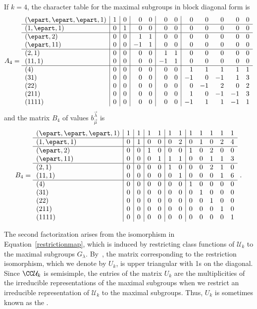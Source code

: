 \begin{example}
If $k = 4$, the character table for the maximal
subgroups in block diagonal form is
$$
A_4 = \begin{array}{l|r|r|rr|rr|rrrrr}
(\epart, \epart, \epart, 1) & 1 & 0 & 0 & 0 & 0 & 0 & 0 & 0 & 0 & 0 & 0\\
\hline
(1, \epart, 1) &0 & 1 & 0 & 0 & 0 & 0 & 0 & 0 & 0 & 0 & 0\\
\hline
(\epart, 2) &0 & 0 & 1 & 1 & 0 & 0 & 0 & 0 & 0 & 0 & 0\\
(\epart, 11) &0 & 0 & -1 & 1 & 0 & 0 & 0 & 0 & 0 & 0 & 0\\
\hline
(2, 1) &0 & 0 & 0 & 0 & 1 & 1 & 0 & 0 & 0 & 0 & 0\\
(11, 1) &0 & 0 & 0 & 0 & -1 & 1 & 0 & 0 & 0 & 0 & 0\\
\hline
(4) &0 & 0 & 0 & 0 & 0 & 0 & 1 & 1 & 1 & 1 & 1\\
(31) &0 & 0 & 0 & 0 & 0 & 0 & -1 & 0 & -1 & 1 & 3\\
(22) &0 & 0 & 0 & 0 & 0 & 0 & 0 & -1 & 2 & 0 & 2\\
(211) &0 & 0 & 0 & 0 & 0 & 0 & 1 & 0 & -1 & -1 & 3\\
(1111) &0 & 0 & 0 & 0 & 0 & 0 & -1 & 1 & 1 & -1 & 1
\end{array}
$$
and the matrix
$B_4$ of values $b^{\vec{\lambda}}_{\vec{\mu}}$ is
$$
B_4 = \begin{array}{l|r|r|rr|rr|rrrrr}
(\epart, \epart, \epart, 1) & 1 & 1 & 1 & 1 & 1 & 1 & 1 & 1 & 1 & 1 & 1\\
\hline
(1, \epart, 1) &0 & 1 & 0 & 0 & 0 & 2 & 0 & 1 & 0 & 2 & 4\\
\hline
(\epart, 2) &0 & 0 & 1 & 0 & 0 & 0 & 1 & 0 & 2 & 0 & 0\\
(\epart, 11) &0 & 0 & 0 & 1 & 1 & 1 & 0 & 0 & 1 & 1 & 3\\
\hline
(2, 1) &0 & 0 & 0 & 0 & 1 & 0 & 0 & 0 & 2 & 1 & 0\\
(11, 1) &0 & 0 & 0 & 0 & 0 & 1 & 0 & 0 & 0 & 1 & 6\\
\hline
(4) &0 & 0 & 0 & 0 & 0 & 0 & 1 & 0 & 0 & 0 & 0\\
(31) &0 & 0 & 0 & 0 & 0 & 0 & 0 & 1 & 0 & 0 & 0\\
(22) &0 & 0 & 0 & 0 & 0 & 0 & 0 & 0 & 1 & 0 & 0\\
(211) &0 & 0 & 0 & 0 & 0 & 0 & 0 & 0 & 0 & 1 & 0\\
(1111) &0 & 0 & 0 & 0 & 0 & 0 & 0 & 0 & 0 & 0 & 1
\end{array}~.
$$
\end{example}

The second factorization arises from the isomorphism in
Equation~\eqref{restrictionmap}, which is induced by restricting class
functions of $\mathcal{U}_k$ to the maximal subgroups $G_\lambda$.
By~\cite[Theorem 6.5]{Steinberg.2016}, the matrix corresponding to the restriction isomorphism,
which we denote by $U_k$, is upper triangular with 1s on the diagonal. Since $\CC\mathcal{U}_k$
is semisimple, the entries of the matrix $U_k$ are the multiplicities of the
irreducible representations of the maximal subgroups when we restrict an
irreducible representation of $\mathcal{U}_k$ to the maximal subgroups.
Thus, $U_k$ is sometimes known as the .

